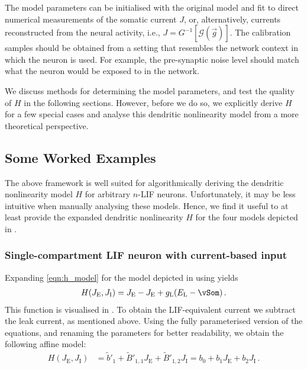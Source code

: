 
The model parameters can be initialised with the original model and fit to direct numerical measurements of the somatic current $J$, or, alternatively, currents reconstructed from the neural activity, i.e., $J = G^{-1}[\mathscr{G}(\vec g)]$.
The calibration samples should be obtained from a setting that resembles the network context in which the neuron is used.
For example, the pre-synaptic noise level should match what the neuron would be exposed to in the network.

We discuss methods for determining the model parameters, and test the quality of $H$ in the following sections.
However, before we do so, we explicitly derive $H$ for a few special cases and analyse this dendritic nonlinearity model from a more theoretical perspective.


\subsection{Some Worked Examples}
\label{sec:nlif_examples}

The above framework is well suited for algorithmically deriving the dendritic nonlinearity model $H$ for arbitrary $n$-LIF neurons.
Unfortunately, it may be less intuitive when manually analysing these models.
Hence, we find it useful to at least provide the expanded dendritic nonlinearity $H$ for the four models depicted in .

\subsubsection{Single-compartment LIF neuron with current-based input}
Expanding \cref{eqn:h_model} for the model depicted in  using  yields 
\begin{align*}
	H(J_\mathrm{E}, J_\mathrm{I}) = J_\mathrm{E} - J_\mathrm{E} + g_\mathrm{L}(E_\mathrm{L} - \vSom) \,.
\end{align*}
This function is visualised in . To obtain the LIF-equivalent current we subtract the leak current, as mentioned above.
Using the fully parameterised version of the equations, and renaming the parameters for better readability, we obtain the following affine model:
\begin{align*}
	H(J_\mathrm{E}, J_\mathrm{I}) &= \tilde b'_1 + \tilde B'_{1, 1} J_\mathrm{E} + \tilde B'_{1, 2} J_\mathrm{I} = b_0 + b_1 J_\mathrm{E} + b_2 J_\mathrm{I} \,.
\end{align*}

